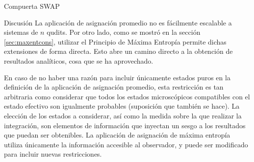 \begin{frame}{Compuerta SWAP}
    \lipsum[1]
\end{frame}

\begin{frame}{Discusión}
    La aplicación de asignación promedio no es fácilmente escalable a sistemas de $n$ qudits. Por otro lado, como se mostró en la sección \ref{sec:maxentcons}, utilizar el Principio de Máxima Entropía permite dichas extensiones de forma directa. Esto abre un camino directo a la obtención de resultados analíticos, cosa que se ha aprovechado. 
    
    En caso de no haber una razón para incluir únicamente estados puros en la definición de la aplicación de asignación promedio, esta restricción es tan arbitraria como considerar que todos los estados microscópicos compatibles con el estado efectivo son igualmente probables (suposición que también se hace). La elección de los estados a considerar, así como la medida sobre la que realizar la integración, son elementos de información que inyectan un sesgo a los resultados que puedan ser obtenibles. La aplicación de asignación de máxima entropía utiliza únicamente la información accesible al observador, y puede ser modificado para incluir nuevas restricciones. 
\end{frame}